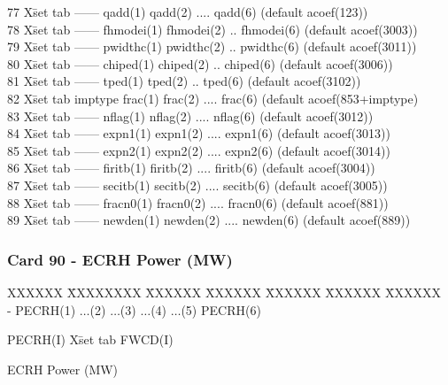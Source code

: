 \begin{tabbing}
77 X\= set tab  \> ------   qadd(1)    qadd(2)  ....  qadd(6)  (default acoef(123)) \\
78 X\= set tab  \> ------   fhmodei(1) fhmodei(2) ..  fhmodei(6) (default acoef(3003)) \\
79 X\= set tab  \> ------   pwidthc(1) pwidthc(2) ..  pwidthc(6) (default acoef(3011)) \\
80 X\= set tab  \> ------   chiped(1)  chiped(2)  ..  chiped(6)  (default acoef(3006)) \\
81 X\= set tab  \> ------   tped(1)    tped(2)    ..  tped(6)    (default acoef(3102)) \\
82 X\= set tab  \> imptype   frac(1)    frac(2)  ....  frac(6) (default acoef(853+imptype) \\
83 X\= set tab  \> ------   nflag(1)    nflag(2)  ....  nflag(6)  (default acoef(3012)) \\
84 X\= set tab  \> ------   expn1(1)    expn1(2)  ....  expn1(6)  (default acoef(3013)) \\
85 X\= set tab  \> ------   expn2(1)    expn2(2)  ....  expn2(6)  (default acoef(3014)) \\
86 X\= set tab  \> ------   firitb(1)    firitb(2)  ....  firitb(6)  (default acoef(3004)) \\
87 X\= set tab  \> ------   secitb(1)    secitb(2)  ....  secitb(6)  (default acoef(3005)) \\
88 X\= set tab  \> ------   fracn0(1)    fracn0(2)  ....  fracn0(6)  (default acoef(881)) \\
89 X\= set tab  \> ------   newden(1)    newden(2)  ....  newden(6)  (default acoef(889)) \\
\end{tabbing}


\newpage \subsubsection{Card 90 - ECRH Power (MW)}
\begin{tabbing}
XXXXXX \= XXXXXXXX \= XXXXXX \= XXXXXX \= XXXXXX \= XXXXXX \=
XXXXXX       \\
\footnotesize - \>\footnotesize  PECRH(1) \>\footnotesize $\ldots$(2) \>\footnotesize
$\ldots$(3) \>\footnotesize $\ldots$(4) \>\footnotesize $\ldots$(5) \>\footnotesize PECRH(6)
\\
\end{tabbing}
\begin{tabbing}
PECRH(I) X\= set tab \kill
FWCD(I) \> \parbox[t]{\width}{
ECRH Power (MW)
}
\end{tabbing}

